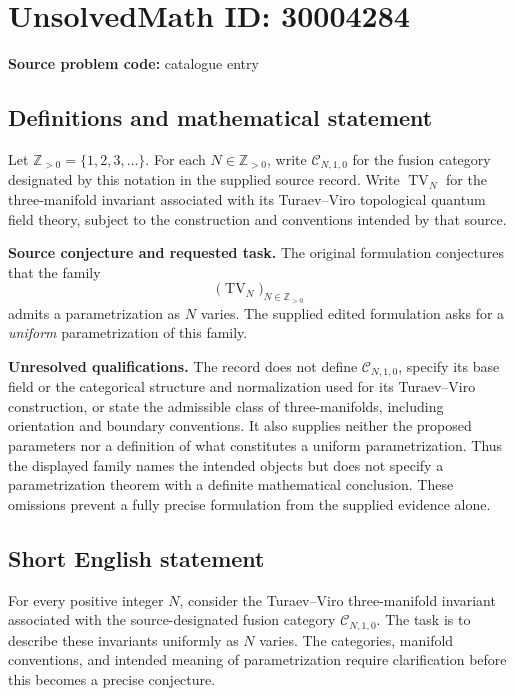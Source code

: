 \documentclass[11pt]{article}
\newcommand{\Z}{\mathbb{Z}}
\begin{document}
\section*{UnsolvedMath ID: 30004284}
\textbf{Source problem code:} catalogue entry
\subsection{Definitions and mathematical statement}
Let \(\Z_{>0}=\{1,2,3,\ldots\}\). For each \(N\in\Z_{>0}\), write \(\mathcal C_{N,1,0}\) for the fusion category designated by this notation in the supplied source record. Write \(\operatorname{TV}_N\) for the three-manifold invariant associated with its Turaev--Viro topological quantum field theory, subject to the construction and conventions intended by that source.

\textbf{Source conjecture and requested task.} The original formulation conjectures that the family
\[
\bigl(\operatorname{TV}_N\bigr)_{N\in\Z_{>0}}
\]
admits a parametrization as \(N\) varies. The supplied edited formulation asks for a \emph{uniform} parametrization of this family.

\textbf{Unresolved qualifications.} The record does not define \(\mathcal C_{N,1,0}\), specify its base field or the categorical structure and normalization used for its Turaev--Viro construction, or state the admissible class of three-manifolds, including orientation and boundary conventions. It also supplies neither the proposed parameters nor a definition of what constitutes a uniform parametrization. Thus the displayed family names the intended objects but does not specify a parametrization theorem with a definite mathematical conclusion. These omissions prevent a fully precise formulation from the supplied evidence alone.
\subsection{Short English statement}
For every positive integer \(N\), consider the Turaev--Viro three-manifold invariant associated with the source-designated fusion category \(\mathcal C_{N,1,0}\). The task is to describe these invariants uniformly as \(N\) varies. The categories, manifold conventions, and intended meaning of parametrization require clarification before this becomes a precise conjecture.
\end{document}
